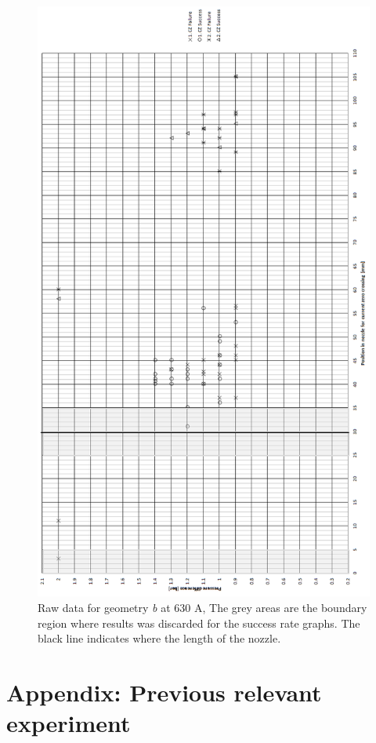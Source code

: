 \documentclass[10pt,a4paper,twoside]{article}
\begin{document}
\begin{figure}[H]
\centering
\includegraphics[scale=0.55]{Bilder/Results/rawData630AgeoB.png}
\caption{Raw data for geometry \textit{b} at 630 A, The grey areas are the boundary region where results was discarded for the success rate graphs. The black line indicates where the length of the nozzle.} \label{fig:rawData630AgeoB}
\end{figure}

\cleardoublepage
\section{Appendix: Previous relevant experiment} \label{app:PrevReleEx}
\makeatletter 
\renewcommand{\thefigure}{B.\@arabic\c@figure}
\makeatother
\end{document}
